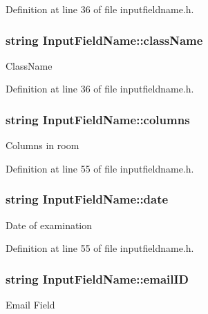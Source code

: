 Definition at line 36 of file inputfieldname.\-h.

\hypertarget{classInputFieldName_ad8b28ebeabdabb5967542e317f549280}{
\subsubsection[{class\-Name}]{\setlength{\rightskip}{0pt plus 5cm}string Input\-Field\-Name\-::class\-Name}}\label{classInputFieldName_ad8b28ebeabdabb5967542e317f549280}
Class\-Name 

Definition at line 36 of file inputfieldname.\-h.

\hypertarget{classInputFieldName_abca049f347e589f24b672c19907c5c72}{
\subsubsection[{columns}]{\setlength{\rightskip}{0pt plus 5cm}string Input\-Field\-Name\-::columns}}\label{classInputFieldName_abca049f347e589f24b672c19907c5c72}
Columns in room 

Definition at line 55 of file inputfieldname.\-h.

\hypertarget{classInputFieldName_afb053a44abe76e108533e23902e90321}{
\subsubsection[{date}]{\setlength{\rightskip}{0pt plus 5cm}string Input\-Field\-Name\-::date}}\label{classInputFieldName_afb053a44abe76e108533e23902e90321}
Date of examination 

Definition at line 55 of file inputfieldname.\-h.

\hypertarget{classInputFieldName_a05541618feaaebe7a3f74b0bf8fa74b9}{
\subsubsection[{email\-I\-D}]{\setlength{\rightskip}{0pt plus 5cm}string Input\-Field\-Name\-::email\-I\-D}}\label{classInputFieldName_a05541618feaaebe7a3f74b0bf8fa74b9}
Email Field 

